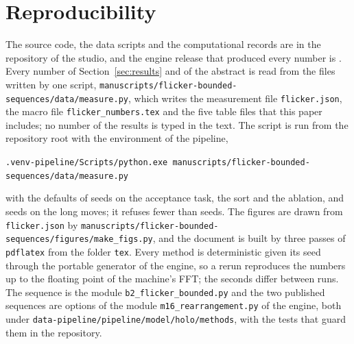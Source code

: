 \section{Reproducibility}\label{sec:repro}

The source code, the data scripts and the computational records are in the repository of the studio, and the engine release that produced every number is \engineRelease{}. Every number of Section~\ref{sec:results} and of the abstract is read from the files written by one script, \texttt{manuscripts/flicker-bounded-sequences/data/measure.py}, which writes the measurement file \texttt{flicker.json}, the macro file \texttt{flicker\_numbers.tex} and the five table files that this paper includes; no number of the results is typed in the text. The script is run from the repository root with the environment of the pipeline,
\begin{center}\small\texttt{.venv-pipeline/Scripts/python.exe manuscripts/flicker-bounded-sequences/data/measure.py}\end{center}
with the defaults of \nSeedsTwo{} seeds on the acceptance task, the sort and the ablation, and \longSeeds{} seeds on the long moves; it refuses fewer than \winMinSeeds{} seeds. The figures are drawn from \texttt{flicker.json} by \texttt{manuscripts/flicker-bounded-sequences/figures/make\_figs.py}, and the document is built by three passes of \texttt{pdflatex} from the folder \texttt{tex}. Every method is deterministic given its seed through the portable generator of the engine, so a rerun reproduces the numbers up to the floating point of the machine's FFT; the seconds differ between runs. The sequence is the module \texttt{b2\_flicker\_bounded.py} and the two published sequences are options of the module \texttt{m16\_rearrangement.py} of the engine, both under \texttt{data-pipeline/pipeline/model/holo/methods}, with the tests that guard them in the repository.
